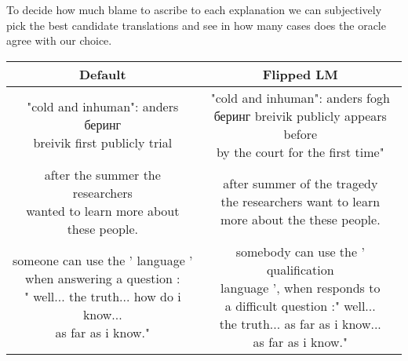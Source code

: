 To decide how much blame to ascribe to each explanation we can subjectively pick the best candidate translations and see in how many cases does the oracle agree with our choice.

\begin{table}
	\centering
	\begin{tabular}{||c|c||}
	\hline
	Default & Flipped LM\\
	\hline
	\parbox{7cm}{\vspace{.5\baselineskip} "cold and inhuman": anders беринг\\breivik first publicly trial\vspace{.5\baselineskip}} &
	\parbox{7cm}{\vspace{.5\baselineskip} "cold and inhuman": anders fogh\\беринг breivik publicly appears before\\by the court for the first time"\vspace{.5\baselineskip}}\\
	\hline
	\parbox{7cm}{\vspace{.5\baselineskip} after the summer the researchers\\wanted to learn more about\\these people.\vspace{.5\baselineskip}} &
	\parbox{7cm}{\vspace{.5\baselineskip} after summer of the tragedy\\the researchers want to learn\\more about the these people.\vspace{.5\baselineskip}}\\
	\hline
	\parbox{7cm}{\vspace{.5\baselineskip} someone can use the ' language '\\when answering a question :\\" well... the truth... how do i know...\\as far as i know."\vspace{.5\baselineskip}} &
	\parbox{7cm}{\vspace{.5\baselineskip} somebody can use the ' qualification\\language ', when responds to\\a difficult question :" well...\\the truth... as far as i know...\\as far as i know."\vspace{.5\baselineskip}}\\

\end{tabular}
\end{table}
